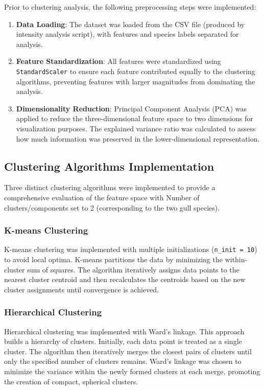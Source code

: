 \documentclass[a4paper,12pt]{report}
\begin{document}
Prior to clustering analysis, the following preprocessing steps were implemented:
\begin{enumerate}
    \item \textbf{Data Loading}: The dataset was loaded from the CSV file (produced by intensity analysis script), with features and species labels separated for analysis.
    \item \textbf{Feature Standardization}: All features were standardized using \texttt{StandardScaler} to ensure each feature contributed equally to the clustering algorithms, preventing features with larger magnitudes from dominating the analysis.
    \item \textbf{Dimensionality Reduction}: Principal Component Analysis (PCA) was applied to reduce the three-dimensional feature space to two dimensions for visualization purposes. The explained variance ratio was calculated to assess how much information was preserved in the lower-dimensional representation.
\end{enumerate}

\subsection{Clustering Algorithms Implementation}
Three distinct clustering algorithms were implemented to provide a comprehensive evaluation of the feature space with Number of clusters/components set to 2 (corresponding to the two gull species).

\subsubsection{K-means Clustering}
K-means clustering was implemented with multiple initializations (\texttt{n\_init = 10}) to avoid local optima.
K-means partitions the data by minimizing the within-cluster sum of squares. The algorithm iteratively assigns data points to the nearest cluster centroid and then recalculates the centroids based on the new cluster assignments until convergence is achieved.

\subsubsection{Hierarchical Clustering}

Hierarchical clustering was implemented with Ward's linkage. This approach builds a hierarchy of clusters. Initially, each data point is treated as a single cluster.  The algorithm then iteratively merges the closest pairs of clusters until only the specified number of clusters remains. Ward's linkage was chosen to minimize the variance within the newly formed clusters at each merge, promoting the creation of compact, spherical clusters.
\end{document}
